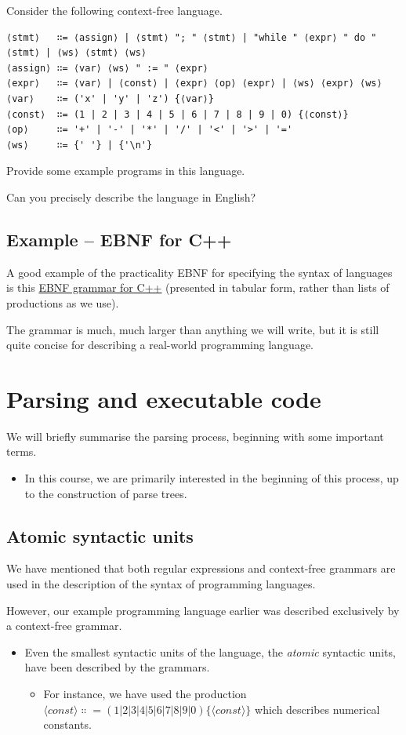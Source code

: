 \documentclass[11pt]{article}
\theoremstyle{definition}
\begin{document}
Consider the following context-free language.
\begin{verbatim}
⟨stmt⟩   ∷= ⟨assign⟩ | ⟨stmt⟩ "; " ⟨stmt⟩ | "while " ⟨expr⟩ " do " ⟨stmt⟩ | ⟨ws⟩ ⟨stmt⟩ ⟨ws⟩
⟨assign⟩ ∷= ⟨var⟩ ⟨ws⟩ " := " ⟨expr⟩
⟨expr⟩   ∷= ⟨var⟩ | ⟨const⟩ | ⟨expr⟩ ⟨op⟩ ⟨expr⟩ | ⟨ws⟩ ⟨expr⟩ ⟨ws⟩
⟨var⟩    ∷= ('x' | 'y' | 'z') {⟨var⟩}
⟨const⟩  ∷= (1 | 2 | 3 | 4 | 5 | 6 | 7 | 8 | 9 | 0) {⟨const⟩}
⟨op⟩     ∷= '+' | '-' | '*' | '/' | '<' | '>' | '='
⟨ws⟩     ∷= {' '} | {'\n'}
\end{verbatim}

Provide some example programs in this language.

Can you precisely describe the language in English?

\subsection{Example – EBNF for C++}
\label{sec:orga699bc4}

A good example of the practicality EBNF for specifying
the syntax of languages is this
\href{http://www.externsoft.ch/download/cpp-iso.html}{EBNF grammar for C++}
(presented in tabular form, rather than lists of productions
as we use).

The grammar is much, much larger than anything we will write,
but it is still quite concise for describing
a real-world programming language.

\section{Parsing and executable code}
\label{sec:org1b15fc9}

We will briefly summarise the parsing process,
beginning with some important terms.
\begin{itemize}
\item In this course, we are primarily interested in
the beginning of this process, up to the
construction of parse trees.
\end{itemize}

\subsection{Atomic syntactic units}
\label{sec:org52cd2c2}

We have mentioned that both regular expressions and
context-free grammars are used in the description of
the syntax of programming languages.

However, our example programming language earlier
was described exclusively by a context-free grammar.
\begin{itemize}
\item Even the smallest syntactic units of the language,
the \emph{atomic} syntactic units, have been described by the grammars.
\begin{itemize}
\item For instance, we have used the production
\(⟨const⟩  ∷= (1 | 2 | 3 | 4 | 5 | 6 | 7 | 8 | 9 | 0) \{⟨const⟩\}\)
which describes numerical constants.
\end{itemize}
\end{itemize}
\end{document}
